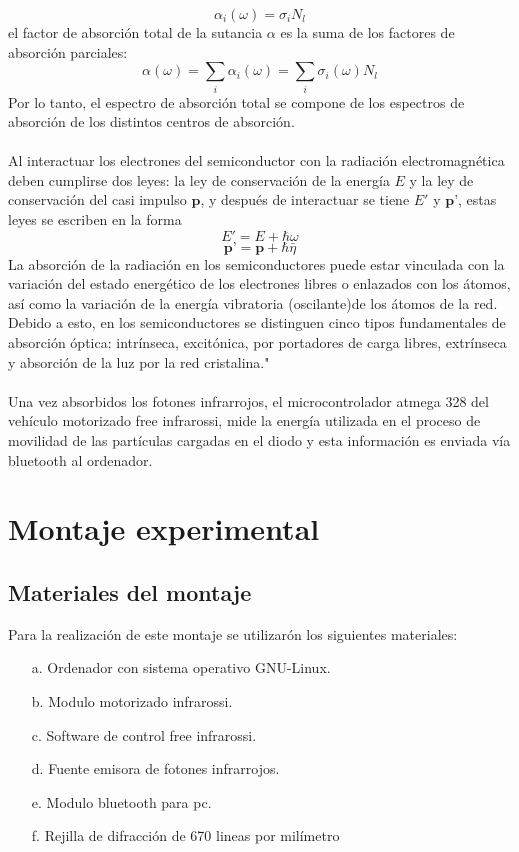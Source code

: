\documentclass[12]{article}
\begin{document}
\begin{multicols}{2}
\begin{equation}
\alpha_{i}(\omega) = \sigma_{i} N_{l}
\end{equation}
el factor de absorción total de la sutancia $\alpha$ es la suma de los factores de absorción parciales:
\begin{equation}
\alpha(\omega) = \sum_{i} \alpha_{i}(\omega) = \sum_{i} \sigma_{i}(\omega)N_{l}
\end{equation}
Por lo tanto, el espectro de absorción total se compone de los espectros de absorción de los distintos centros de absorción. \\\\
Al interactuar los electrones del semiconductor con la radiación electromagnética deben cumplirse dos leyes: la ley de conservación de la energía  $E$ y la ley de conservación del casi impulso $\textbf{p}$, y después de interactuar se tiene $E'$ y $\textbf{p'}$, estas leyes se escriben en la forma 
\begin{equation}
E' = E + \hbar \omega
\end{equation}
\begin{equation}
\textbf{p'} = \textbf{p} + \hbar \bar{\eta}
\end{equation}
La absorción de la radiación en los semiconductores puede estar vinculada con la variación del estado energético de los electrones libres o enlazados con los átomos, así como la variación de la energía vibratoria (oscilante)de los átomos de la red. Debido a esto, en los semiconductores se distinguen cinco tipos fundamentales  de absorción óptica: intrínseca, excitónica, por portadores de carga libres, extrínseca y absorción de la luz por la red cristalina."\cite{ESTADO_SOLIDO} \\\\
Una vez absorbidos los fotones infrarrojos, el microcontrolador atmega 328 del vehículo motorizado free infrarossi, mide la energía utilizada en el proceso de movilidad de las partículas cargadas en el diodo y esta información es enviada vía bluetooth al ordenador.
\section{Montaje experimental}
\subsection{Materiales del montaje}
Para la realización de este montaje se utilizarón los siguientes materiales:
\begin{enumerate}
\item[a.] Ordenador con sistema operativo GNU-Linux.
\item[b.] Modulo motorizado infrarossi.
\item[c.] Software de control free infrarossi.
\item[d.] Fuente emisora de fotones infrarrojos.
\item[e.] Modulo bluetooth para pc.
\item[f.] Rejilla de difracción de 670 lineas por milímetro 
\end{enumerate}

\end{multicols}
\end{document}
